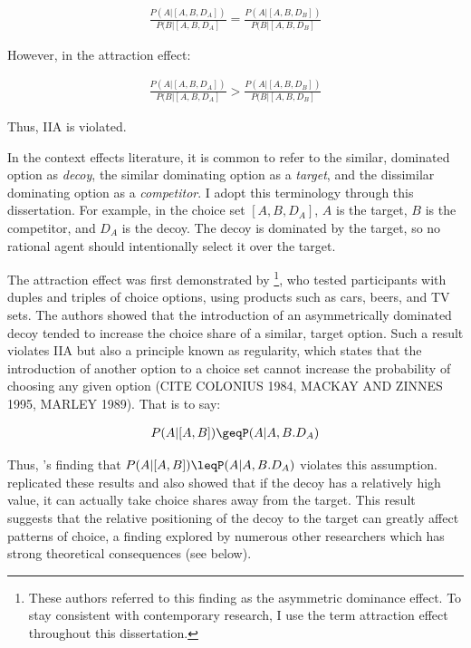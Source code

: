 \begin{align}
  \frac{P(A|[A,B,D_{A}])}{P(B|[A,B,D_{A}]}=\frac{P(A|[A,B,D_{B}])}{P(B|[A,B,D_{B}]}
  \label{eqn:iia}
\end{align}

However, in the attraction effect:

\begin{align}
  \frac{P(A|[A,B,D_{A}])}{P(B|[A,B,D_{A}]}>\frac{P(A|[A,B,D_{B}])}{P(B|[A,B,D_{B}]}
  \label{eqn:iia_att}
\end{align}

Thus, IIA is violated.

In the context effects literature, it is common to refer to the similar, dominated option as \textit{decoy}, the similar dominating option as a \textit{target}, and the dissimilar dominating option as a \textit{competitor}. I adopt this terminology through this dissertation. For example, in the choice set $[A,B,D_{A}]$, $A$ is the target, $B$ is the competitor, and $D_{A}$ is the decoy.  The decoy is dominated by the target, so no rational agent should intentionally select it over the target.  

The attraction effect was first demonstrated by \textcite{huberAddingAsymmetricallyDominated1982d} \footnote{These authors referred to this finding as the asymmetric dominance effect. To stay consistent with contemporary research, I use the term attraction effect throughout this dissertation.}, who tested participants with duples and triples of choice options, using products such as cars, beers, and TV sets. The authors showed that the introduction of an asymmetrically dominated decoy tended to increase the choice share of a similar, target option. Such a result violates IIA but also a principle known as regularity, which states that the introduction of another option to a choice set cannot increase the probability of choosing any given option (CITE COLONIUS 1984, MACKAY AND ZINNES 1995, MARLEY 1989). That is to say:

\begin{align}
  P(A|[A,B])\geqP(A|A,B.D_{A})
  \label{eqn:reg_att}
\end{align}

Thus, \textcite{huberAddingAsymmetricallyDominated1982d}'s finding that $P(A|[A,B])\leqP(A|A,B.D_{A})$ violates this assumption. \textcite{huber1983market} replicated these results and also showed that if the decoy has a relatively high value, it can actually take choice shares away from the target. This result suggests that the relative positioning of the decoy to the target can greatly affect patterns of choice, a finding explored by numerous other researchers which has strong theoretical consequences (see below). 

